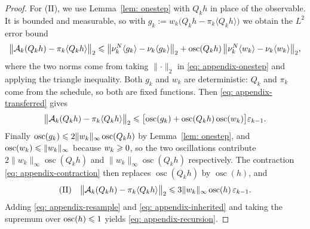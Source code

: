 \documentclass{article}
\begin{document}
\begin{proof}
For (II), we use Lemma~\ref{lem: onestep} with $Q_kh$ in place of the observable. It is bounded and measurable, so with $g_k := w_k\bigl(Q_kh-\pi_k\langle Q_kh\rangle\bigr)$ we obtain the $L^2$ error bound
\begin{equation*}
    \bigl\lVert \mathcal A_k(Q_kh)-\pi_k\langle Q_kh\rangle\bigr\rVert_2
    \leqslant \bigl\lVert\nu_k^N\langle g_k\rangle-\nu_k\langle g_k\rangle\bigr\rVert_2
    + \operatorname{osc}(Q_kh)\,\bigl\lVert\nu_k^N\langle w_k\rangle-\nu_k\langle w_k\rangle\bigr\rVert_2 ,
\end{equation*}
where the two norms come from taking $\lVert\cdot\rVert_2$ in \eqref{eq: appendix-onestep} and applying the triangle inequality. Both $g_k$ and $w_k$ are deterministic: $Q_k$ and $\pi_k$ come from the schedule, so both are fixed functions. Then \eqref{eq: appendix-transferred} gives
\begin{equation*}
    \bigl\lVert \mathcal A_k(Q_kh)-\pi_k\langle Q_kh\rangle\bigr\rVert_2
    \leqslant \bigl[\operatorname{osc}(g_k)+\operatorname{osc}(Q_kh)\operatorname{osc}(w_k)\bigr]\varepsilon_{k-1} .
\end{equation*}
Finally $\operatorname{osc}(g_k)\leqslant2\lVert w_k\rVert_\infty\operatorname{osc}(Q_kh)$ by Lemma~\ref{lem: onestep}, and $\operatorname{osc}(w_k)\leqslant\lVert w_k\rVert_\infty$ because $w_k\geqslant0$, so the two oscillations contribute $2\lVert w_k\rVert_\infty\operatorname{osc}(Q_kh)$ and $\lVert w_k\rVert_\infty\operatorname{osc}(Q_kh)$ respectively. The contraction \eqref{eq: appendix-contraction} then replaces $\operatorname{osc}(Q_kh)$ by $\operatorname{osc}(h)$, and
\begin{equation}
	\text{(II)} \quad
    \bigl\lVert \mathcal A_k(Q_kh)-\pi_k\langle Q_kh\rangle\bigr\rVert_2
    \leqslant 3\lVert w_k\rVert_\infty\operatorname{osc}(h)\,\varepsilon_{k-1} .
    \label{eq: appendix-inherited}
\end{equation}
Adding \eqref{eq: appendix-resample} and \eqref{eq: appendix-inherited} and taking the supremum over $\operatorname{osc}(h)\leqslant1$ yields \eqref{eq: appendix-recursion}.


\end{proof}
\end{document}
